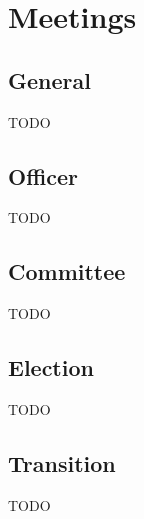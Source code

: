 \chapter{Meetings}

\section{General}\label{sec:general_meetings}
TODO

\section{Officer}\label{sec:officer_meetings}
TODO

\section{Committee}\label{sec:committee_meetings}
TODO

\section{Election}\label{sec:election_meeting}
TODO

\section{Transition}\label{sec:transition_meeting}
TODO
